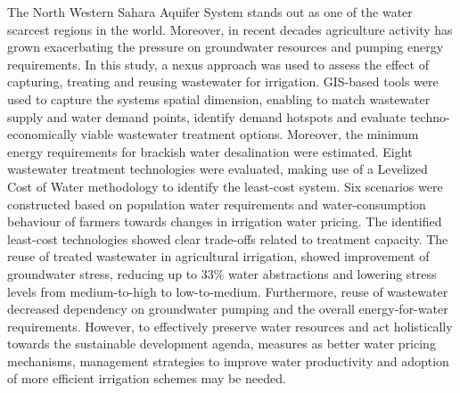 The North Western Sahara Aquifer System stands out as one of the water scarcest regions in the world. Moreover, in recent decades agriculture activity has grown exacerbating the pressure on groundwater resources and pumping energy requirements. In this study, a nexus approach was used to assess the effect of capturing, treating and reusing wastewater for irrigation. GIS-based tools were used to capture the systems spatial dimension, enabling to match wastewater supply and water demand points, identify demand hotspots and evaluate techno-economically viable wastewater treatment options. Moreover, the minimum energy requirements for brackish water desalination were estimated. Eight wastewater treatment technologies were evaluated, making use of a Levelized Cost of Water methodology to identify the least-cost system. Six scenarios were constructed based on population water requirements and water-consumption behaviour of farmers towards changes in irrigation water pricing. The identified least-cost technologies showed clear trade-offs related to treatment capacity. The reuse of treated wastewater in agricultural irrigation, showed improvement of groundwater stress, reducing up to 33\% water abstractions and lowering stress levels from medium-to-high to low-to-medium. Furthermore, reuse of wastewater decreased dependency on groundwater pumping and the overall energy-for-water requirements. However, to effectively preserve water resources and act holistically towards the sustainable development agenda, measures as better water pricing mechanisms, management strategies to improve water productivity and adoption of more efficient irrigation schemes may be needed.